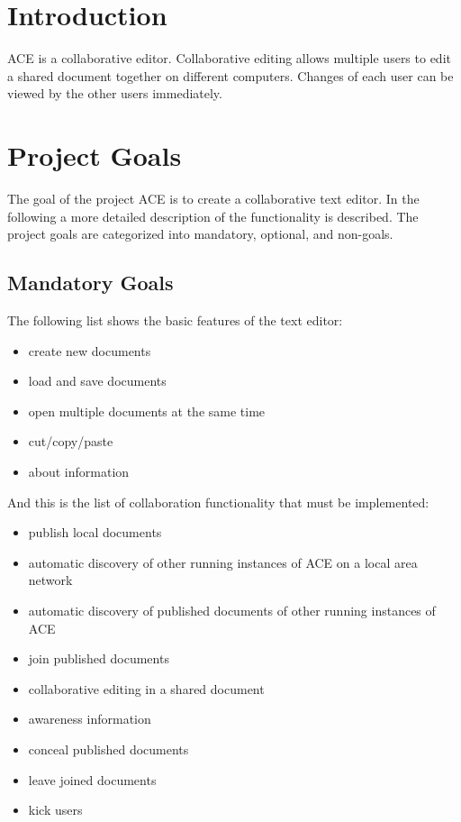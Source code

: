 \documentclass[11pt,a4paper]{article}
\begin{document}
\setlength{\parindent}{0pt}



\tableofcontents
\newpage

\section{Introduction}

ACE is a collaborative editor. Collaborative editing allows multiple users
to edit a shared document together on different computers. Changes of each 
user can be viewed by the other users immediately.


\section{Project Goals}

The goal of the project ACE is to create a collaborative text editor. In 
the following a more detailed description of the functionality is described.
The project goals are categorized into mandatory, optional, and non-goals.

\subsection{Mandatory Goals}

The following list shows the basic features of the text editor:

\begin{itemize}
 \item create new documents
 \item load and save documents
 \item open multiple documents at the same time
 \item cut/copy/paste
 \item about information
\end{itemize}

And this is the list of collaboration functionality that must be implemented:

\begin{itemize}
 \item publish local documents
 \item automatic discovery of other running instances of ACE on a local area network
 \item automatic discovery of published documents of other running instances of ACE
 \item join published documents
 \item collaborative editing in a shared document
 \item awareness information
 \item conceal published documents
 \item leave joined documents
 \item kick users
\end{itemize}
\end{document}
